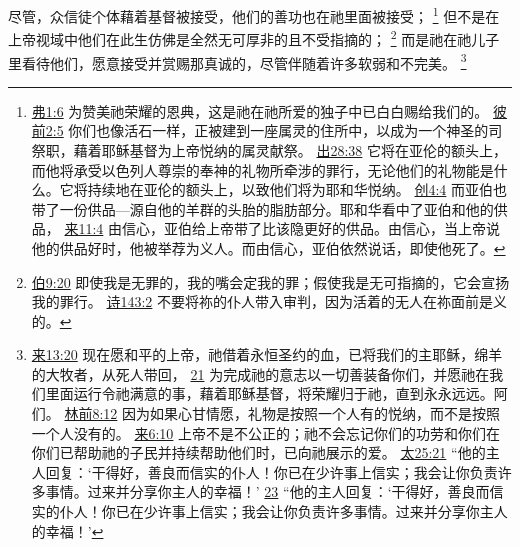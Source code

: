 \documentclass[12pt, a4paper, oneside]{ctexart}
\newcounter{parnum}[section]
\newcommand{\N}{%
   \noindent\refstepcounter{parnum}%
    \makebox[\parindent][l]{\textbf{\arabic{parnum}.}}}
\begin{document}
\N 尽管，众信徒个体藉着基督被接受，他们的善功也在祂里面被接受；
	\footnote {
		\href{https://biblehub.com/ephesians/1-6.htm}{弗1:6} 为赞美祂荣耀的恩典，这是祂在祂所爱的独子中已白白赐给我们的。
		\href{https://biblehub.com/1_peter/2-5.htm}{彼前2:5} 你们也像活石一样，正被建到一座属灵的住所中，以成为一个神圣的司祭职，藉着耶稣基督为上帝悦纳的属灵献祭。
		\href{https://biblehub.com/exodus/28-38.htm}{出28:38} 它将在亚伦的额头上，而他将承受以色列人尊崇的奉神的礼物所牵涉的罪行，无论他们的礼物能是什么。它将持续地在亚伦的额头上，以致他们将为耶和华悦纳。
		\href{https://biblehub.com/genesis/4-4.htm}{创4:4} 而亚伯也带了一份供品---源自他的羊群的头胎的脂肪部分。耶和华看中了亚伯和他的供品，
		\href{https://biblehub.com/hebrews/11-4.htm}{来11:4} 由信心，亚伯给上帝带了比该隐更好的供品。由信心，当上帝说他的供品好时，他被举荐为义人。而由信心，亚伯依然说话，即使他死了。
	}
	但不是在上帝视域中他们在此生仿佛是全然无可厚非的且不受指摘的；
	\footnote {
		\href{https://biblehub.com/job/9-20.htm}{伯9:20} 即使我是无罪的，我的嘴会定我的罪；假使我是无可指摘的，它会宣扬我的罪行。
		\href{https://biblehub.com/psalms/143-2.htm}{诗143:2} 不要将祢的仆人带入审判，因为活着的无人在祢面前是义的。
	}
	而是祂在祂儿子里看待他们，愿意接受并赏赐那真诚的，尽管伴随着许多软弱和不完美。
	\footnote {
		\href{https://biblehub.com/hebrews/13-20.htm}{来13:20} 现在愿和平的上帝，祂借着永恒圣约的血，已将我们的主耶稣，绵羊的大牧者，从死人带回，
		\href{https://biblehub.com/hebrews/13-21.htm}{21} 为完成祂的意志以一切善装备你们，并愿祂在我们里面运行令祂满意的事，藉着耶稣基督，将荣耀归于祂，直到永永远远。阿们。
		\href{https://biblehub.com/2_corinthians/8-12.htm}{林前8:12} 因为如果心甘情愿，礼物是按照一个人有的悦纳，而不是按照一个人没有的。
		\href{https://biblehub.com/hebrews/6-10.htm}{来6:10} 上帝不是不公正的；祂不会忘记你们的功劳和你们在你们已帮助祂的子民并持续帮助他们时，已向祂展示的爱。
		\href{https://biblehub.com/matthew/25-21.htm}{太25:21} “他的主人回复：‘干得好，善良而信实的仆人！你已在少许事上信实；我会让你负责许多事情。过来并分享你主人的幸福！’
		\href{https://biblehub.com/matthew/25-23.htm}{23} “他的主人回复：‘干得好，善良而信实的仆人！你已在少许事上信实；我会让你负责许多事情。过来并分享你主人的幸福！’
	}
\end{document}

